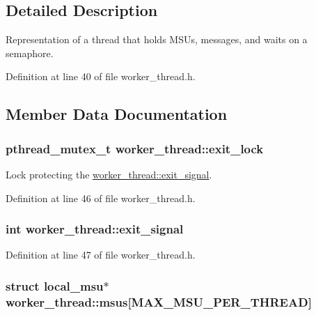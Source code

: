 \subsection{Detailed Description}
Representation of a thread that holds M\-S\-Us, messages, and waits on a semaphore. 

Definition at line 40 of file worker\-\_\-thread.\-h.



\subsection{Member Data Documentation}
\hypertarget{structworker__thread_a92b93bfd566a2cef147993fd851beb30}{
\subsubsection[{exit\-\_\-lock}]{\setlength{\rightskip}{0pt plus 5cm}pthread\-\_\-mutex\-\_\-t worker\-\_\-thread\-::exit\-\_\-lock}}\label{structworker__thread_a92b93bfd566a2cef147993fd851beb30}


Lock protecting the \hyperlink{structworker__thread_a671b6ce2bdb562ebb744b9bcf6764e64}{worker\-\_\-thread\-::exit\-\_\-signal}. 



Definition at line 46 of file worker\-\_\-thread.\-h.

\hypertarget{structworker__thread_a671b6ce2bdb562ebb744b9bcf6764e64}{
\subsubsection[{exit\-\_\-signal}]{\setlength{\rightskip}{0pt plus 5cm}int worker\-\_\-thread\-::exit\-\_\-signal}}\label{structworker__thread_a671b6ce2bdb562ebb744b9bcf6764e64}


Definition at line 47 of file worker\-\_\-thread.\-h.

\hypertarget{structworker__thread_a5b9f22e2454a995f711f92817e5761e2}{
\subsubsection[{msus}]{\setlength{\rightskip}{0pt plus 5cm}struct {\bf local\-\_\-msu}$\ast$ worker\-\_\-thread\-::msus\mbox{[}{\bf M\-A\-X\-\_\-\-M\-S\-U\-\_\-\-P\-E\-R\-\_\-\-T\-H\-R\-E\-A\-D}\mbox{]}}}\label{structworker__thread_a5b9f22e2454a995f711f92817e5761e2}



